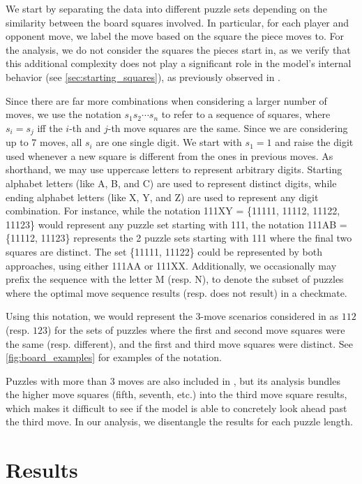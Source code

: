 \documentclass{article}
\begin{document}
We start by separating the data into different puzzle sets depending on the similarity between the board squares involved. In particular, for each player and opponent move, we label the move based on the square the piece moves to. For the analysis, we do not consider the squares the pieces start in, as we verify that this additional complexity does not play a significant role in the model's internal behavior (see \cref{sec:starting_squares}), as previously observed in \citet{jenner2024evidence}.

Since there are far more combinations when considering a larger number of moves, we use the notation $s_1s_2\cdots s_n$ to refer to a sequence of squares, where $s_i=s_j$ iff the $i$-th and $j$-th move squares are the same. Since we are considering up to 7 moves, all $s_i$ are one single digit. We start with $s_1=1$ and raise the digit used whenever a new square is different from the ones in previous moves. As shorthand, we may use uppercase letters to represent arbitrary digits. Starting alphabet letters (like A, B, and C) are used to represent distinct digits, while ending alphabet letters (like X, Y, and Z) are used to represent any digit combination. For instance, while the notation 111XY = \{11111, 11112, 11122, 11123\} would represent any puzzle set starting with 111, the notation 111AB = \{11112, 11123\} represents the 2 puzzle sets starting with 111 where the final two squares are distinct. The set \{11111, 11122\} could be represented by both approaches, using either 111AA or 111XX. Additionally, we occasionally may prefix the sequence with the letter M (resp. N), to denote the subset of puzzles where the optimal move sequence results (resp. does not result) in a checkmate.

Using this notation, we would represent the 3-move scenarios considered in \citet{jenner2024evidence} as $112$ (resp. $123$) for the sets of puzzles where the first and second move squares were the same (resp. different), and the first and third move squares were distinct. See \cref{fig:board_examples} for examples of the notation.

Puzzles with more than 3 moves are also included in \citet{jenner2024evidence}, but its analysis bundles the higher move squares (fifth, seventh, etc.) into the third move square results, which makes it difficult to see if the model is able to concretely look ahead past the third move. In our analysis, we disentangle the results for each puzzle length.

\section{Results}\label{sec:higher_future_move}
\end{document}
